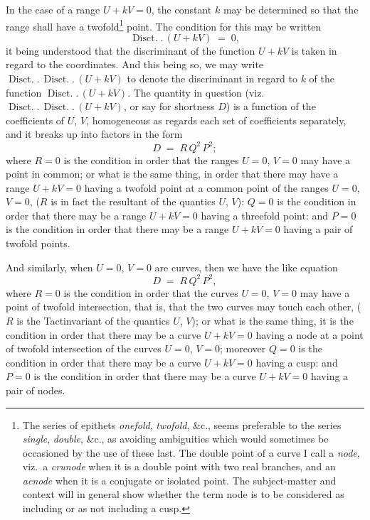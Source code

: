 \documentclass[11pt,a4paper]{article}
\providecommand{\Disct}{\operatorname{Disct.}}
\begin{document}
In the case of a range $U + kV = 0$, the constant $k$ may be determined so that the range shall have a twofold\footnote{The series of epithets \emph{onefold}, \emph{twofold}, \&c., seems preferable to the series \emph{single}, \emph{double}, \&c., as avoiding ambiguities which would sometimes be occasioned by the use of these last. The double point of a curve I call a \emph{node}, viz.\ a \emph{crunode} when it is a double point with two real branches, and an \emph{acnode} when it is a conjugate or isolated point. The subject-matter and context will in general show whether the term node is to be considered as including or as not including a cusp.} point. The condition for this may be written
\[
\Disct.\,(U + kV) \;=\; 0,
\]
it being understood that the discriminant of the function $U + kV$ is taken in regard to the coordinates. And this being so, we may write $\Disct.\,\Disct.\,(U + kV)$ to denote the discriminant in regard to $k$ of the function $\Disct.\,(U + kV)$. The quantity in question (viz.\ $\Disct.\,\Disct.\,(U+kV)$, or say for shortness $D$) is a function of the coefficients of $U$, $V$, homogeneous as regards each set of coefficients separately, and it breaks up into factors in the form
\[
D \;=\; R\,Q^2\,P^2;
\]
where $R = 0$ is the condition in order that the ranges $U = 0$, $V = 0$ may have a point in common; or what is the same thing, in order that there may have a range $U + kV = 0$ having a twofold point at a common point of the ranges $U = 0$, $V = 0$, ($R$ is in fact the resultant of the quantics $U$, $V$): $Q = 0$ is the condition in order that there may be a range $U + kV = 0$ having a threefold point: and $P = 0$ is the condition in order that there may be a range $U + kV = 0$ having a pair of twofold points.

\medskip

And similarly, when $U = 0$, $V = 0$ are curves, then we have the like equation
\[
D \;=\; R\,Q^2\,P^2,
\]
where $R = 0$ is the condition in order that the curves $U = 0$, $V = 0$ may have a point of twofold intersection, that is, that the two curves may touch each other, ($R$ is the Tactinvariant of the quantics $U$, $V$); or what is the same thing, it is the condition in order that there may be a curve $U + kV = 0$ having a node at a point of twofold intersection of the curves $U = 0$, $V = 0$; moreover $Q = 0$ is the condition in order that there may be a curve $U + kV = 0$ having a cusp: and $P = 0$ is the condition in order that there may be a curve $U + kV = 0$ having a pair of nodes.

\medskip
\end{document}
